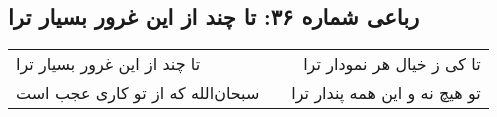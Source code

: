 \begin{center}
\section*{رباعی شماره ۳۶: تا چند از این غرور بسیار ترا}
\label{sec:0036}
\begin{longtable}{l p{0.5cm} r}
تا چند از این غرور بسیار ترا
&&
تا کی ز خیال هر نمودار ترا
\\
سبحان‌الله که از تو کاری عجب است
&&
تو هیچ نه و این همه پندار ترا
\\
\end{longtable}
\end{center}
